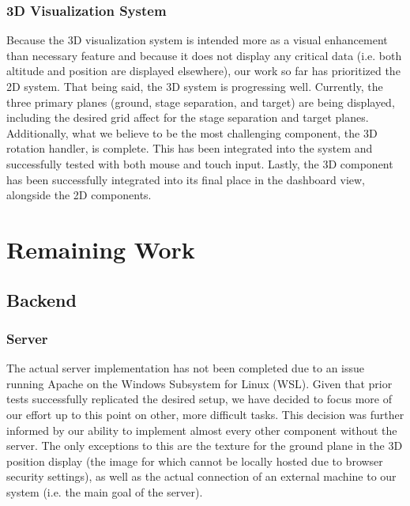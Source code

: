\documentclass[journal,10pt,onecolumn,compsoc]{IEEEtran}
\begin{document}
		\subsubsection{3D Visualization System}
			Because the 3D visualization system is intended more as a visual enhancement than necessary feature and because it does not display any critical data (i.e. both altitude and position are displayed elsewhere), our work so far has prioritized the 2D system.
			That being said, the 3D system is progressing well.
			Currently, the three primary planes (ground, stage separation, and target) are being displayed, including the desired grid affect for the stage separation and target planes.
			Additionally, what we believe to be the most challenging component, the 3D rotation handler, is complete.
			This has been integrated into the system and successfully tested with both mouse and touch input.
			Lastly, the 3D component has been successfully integrated into its final place in the dashboard view, alongside the 2D components.	
\newpage


\section{Remaining Work}

	\subsection{Backend}
		
		\subsubsection{}
			
		\subsubsection{}
		
		\subsubsection{Server}
			The actual server implementation has not been completed due to an issue running Apache on the Windows Subsystem for Linux (WSL).
			Given that prior tests successfully replicated the desired setup, we have decided to focus more of our effort up to this point on other, more difficult tasks.
			This decision was further informed by our ability to implement almost every other component without the server.
			The only exceptions to this are the texture for the ground plane in the 3D position display (the image for which cannot be locally hosted due to browser security settings), as well as the actual connection of an external machine to our system (i.e. the main goal of the server).
	
\end{document}
